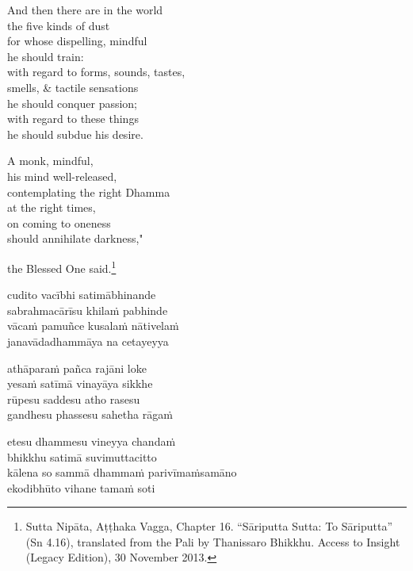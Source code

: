\documentclass[
  babelLanguage=english,
  final,
  webversion,
]{chantingbook}
\newcommand{\verseref}[1]{\sidepar{#1}}
\begin{document}
And then there are in the world\\
the five kinds of dust\\
for whose dispelling, mindful\\
he should train:\\
with regard to forms, sounds, tastes,\\
smells, \& tactile sensations\\
\vin he should conquer passion;\\
with regard to these things\\
\vin he should subdue his desire.

A monk, mindful,\\
his mind well-released,\\
contemplating the right Dhamma\\
at the right times,\\
\vin on coming to oneness\\
\vin should annihilate darkness,"

\vin \vin \vin the Blessed One said.\footnote{%
Sutta Nipāta, Aṭṭhaka Vagga, Chapter 16. ``Sāriputta Sutta: To Sāriputta'' (Sn 4.16), translated from the Pali by
Thanissaro Bhikkhu. Access to Insight (Legacy Edition), 30 November 2013.
}

\clearpage

\paliText

\verseref{19}%
cudito vacībhi satimābhinande\\
sabrahmacārīsu khilaṁ pabhinde\\
vācaṁ pamuñce kusalaṁ nātivelaṁ\\
janavādadhammāya na cetayeyya

\verseref{20}%
athāparaṁ pañca rajāni loke\\
yesaṁ satīmā vinayāya sikkhe\\
rūpesu saddesu atho rasesu\\
gandhesu phassesu sahetha rāgaṁ

\verseref{21}%
etesu dhammesu vineyya chandaṁ\\
bhikkhu satimā suvimuttacitto\\
kālena so sammā dhammaṁ parivīmaṁsamāno\\
ekodibhūto vihane tamaṁ soti
\end{document}
